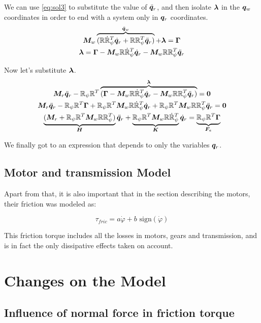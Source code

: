 \documentclass[twoside,onecolumn]{article}
\let\oldsection\section
\renewcommand\section{\Needspace{16\baselineskip}\oldsection}
\let\oldsubsection\subsection
\renewcommand\subsection{\Needspace{13\baselineskip}\oldsubsection}
\renewcommand{\vec}[1]{\bm{#1}}
\newcommand{\R}{\mathbb R}
\begin{document}
We can use \cref{eq:sol3} to substitute the value of $\ddot \q_r$, and then isolate $\mults$ in the $\q_w$ coordinates in order to end with a system only in $\q_r$ coordinates.
\begin{gather}
	\M_w\overbrace{(\R \dot{\R}_{\psi}^T\dot \q_r+
		\R \R_{\psi}^T\ddot \q_r )}^{\ddot \q_w} +\mults=\Torque 
	\nonumber\\
	\mults = \Torque-\M_w\R \dot{\R}_{\psi}^T\dot \q_r-
	\M_w\R \R_{\psi}^T\ddot \q_r \label{eq:sol4}
\end{gather}

Now let's substitute $\mults$.
\begin{gather}
	\M_r\ddot\q_r-\R_{\psi}\R ^T\overbrace{(\Torque-\M_w\R \dot{\R}_{\psi}^T\dot \q_r-
		\M_w\R \R_{\psi}^T\ddot \q_r)}^{\mults}=\vec 0 
	\nonumber\\
	\M_r\ddot\q_r-\R_{\psi}\R ^T\Torque+\R_{\psi}\R ^T\M_w\R \dot{\R}_{\psi}^T\dot \q_r+\R_{\psi}\R ^T
	\M_w\R \R_{\psi}^T\ddot \q_r=\vec 0 
	\nonumber\\
	\underbrace{(\M_r+\R_{\psi}\R ^T
		\M_w\R \R_{\psi}^T)}_{\vec H}\ddot \q_r+
	\underbrace{\R_{\psi}\R ^T\M_w\R \dot{\R}_{\psi}^T}_{\vec K}\dot \q_r=\underbrace{\R_{\psi}\R ^T\Torque}_{\F_a} \label{eq:solution}
\end{gather}

We finally got to an expression that depends to only the variables $\q_r$.\\

\subsection{Motor and transmission Model}

Apart from that, it is also important that in the section describing the motors, their friction was modeled as:

$$\tau_{fric} = a \dot{\varphi} + b \text{ sign} (\dot{\varphi})$$

This friction torque includes all the losses in motors, gears and transmission, and is in fact the only dissipative effects taken on account.



\section{Changes on the Model}


\subsection{Influence of normal force in friction torque}
\end{document}
